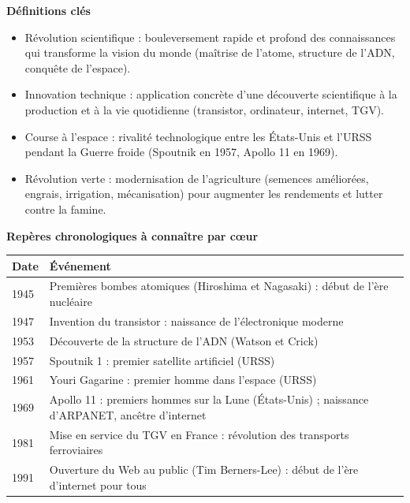 \documentclass[11pt]{article}
\newcommand{\cle}[1]{{\popxbold\color{popdark}#1}}
\begin{document}
\begin{aretenir}
\textbf{Définitions clés}
\begin{itemize}
\item \cle{Révolution scientifique} : bouleversement rapide et profond des connaissances qui transforme la vision du monde (maîtrise de l'atome, structure de l'ADN, conquête de l'espace).
\item \cle{Innovation technique} : application concrète d'une découverte scientifique à la production et à la vie quotidienne (transistor, ordinateur, internet, TGV).
\item \cle{Course à l'espace} : rivalité technologique entre les États-Unis et l'URSS pendant la Guerre froide (Spoutnik en 1957, Apollo 11 en 1969).
\item \cle{Révolution verte} : modernisation de l'agriculture (semences améliorées, engrais, irrigation, mécanisation) pour augmenter les rendements et lutter contre la famine.
\end{itemize}

\textbf{Repères chronologiques à connaître par cœur}
\begin{center}
\begin{tabularx}{\linewidth}{|l|X|}\hline
\rowcolor{popblueL} \textbf{Date} & \textbf{Événement} \\ \hline
1945 & Premières bombes atomiques (Hiroshima et Nagasaki) : début de l'ère nucléaire \\ \hline
1947 & Invention du transistor : naissance de l'électronique moderne \\ \hline
1953 & Découverte de la structure de l'ADN (Watson et Crick) \\ \hline
1957 & Spoutnik 1 : premier satellite artificiel (URSS) \\ \hline
1961 & Youri Gagarine : premier homme dans l'espace (URSS) \\ \hline
1969 & Apollo 11 : premiers hommes sur la Lune (États-Unis) ; naissance d'ARPANET, ancêtre d'internet \\ \hline
1981 & Mise en service du TGV en France : révolution des transports ferroviaires \\ \hline
1991 & Ouverture du Web au public (Tim Berners-Lee) : début de l'ère d'internet pour tous \\ \hline
\end{tabularx}
\end{center}


\end{aretenir}
\end{document}
